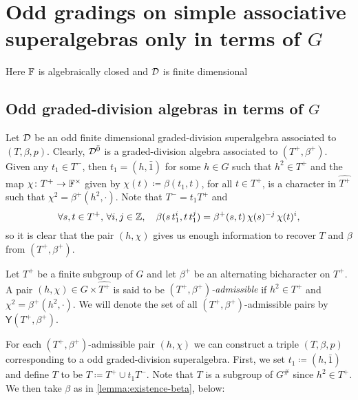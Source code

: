 \section{Odd gradings on simple associative superalgebras only in terms of \texorpdfstring{$G$}{G}}\label{sec:assc-only-G}

Here $\mathbb{F}$ is algebraically closed and $\mathcal{D}$ is finite dimensional

\subsection{Odd graded-division algebras in terms of $G$}\label{ssec:odd-div-G-only}

Let $\mathcal{D}$ be an odd finite dimensional graded-division superalgebra associated to $(T, \beta, p)$. 
Clearly, $\mathcal{D}^{\bar0}$ is a graded-division algebra associated to $(T^+, \beta^+)$. 
Given any $t_1 \in T^-$, then $t_1 = (h, \bar 1)$ for some $h\in G$ such that $h^2\in T^+$ and the map $\chi \colon T^+ \to \mathbb{F}^\times$ given by $\chi(t) \coloneqq \beta(t_1, t)$, for all $t\in T^+$, is a character in $\widehat{T^+}$ such that $\chi^2 = \beta^+ (h^2, \cdot)$.  
Note that $T^- = t_1 T^+$ and
\[\label{eq:beta-from-h-chi}
    \forall s,t\in T^+,\, \forall i,j \in \mathbb{Z}, \quad \beta(s\, t_1^i,t \, t_1^j) = \beta^+(s,t)\, \chi (s)^{-j}\, \chi (t)^i,
\]
so it is clear that the pair $(h, \chi)$ gives us enough information to recover $T$ and $\beta$ from $(T^+, \beta^+)$.

\begin{defi}\label{def:odd-parameters}
    Let $T^+$ be a finite subgroup of $G$ and let $\beta^+$ be an alternating bicharacter on $T^+$. 
    A pair $(h,\chi) \in G \times \widehat{T^+}$ is said to be \emph{$(T^+, \beta^+)$-admissible} if 
    $h^2 \in T^+$ and $\chi^2 = \beta^+(h^2, \cdot)$. 
    We will denote the set of all $(T^+, \beta^+)$-admissible pairs by $\mathsf {Y} (T^+, \beta^+)$.
\end{defi}

    

For each $(T^+, \beta^+)$-admissible pair $(h, \chi)$ we can construct a triple $(T, \beta, p)$ corresponding to a odd graded-division superalgebra. 
First, we set $t_1 \coloneqq (h, \bar 1)$ and define $T$ to be $T \coloneqq T^+ \cup t_1 T^-$. 
Note that $T$ is a subgroup of $G^\#$ since $h^2 \in T^+$. 
We then take $\beta$ as in \cref{lemma:existence-beta}, below:


